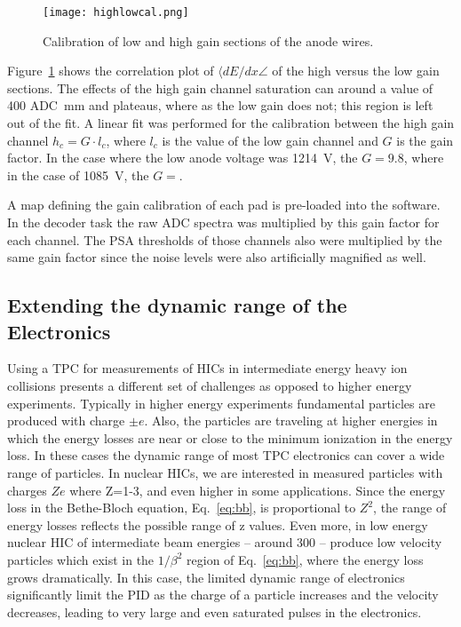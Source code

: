 \begin{figure}[!htb]
\texttt{[image: highlowcal.png]}
\caption{Calibration of low and high gain sections of the anode wires.}
\label{fig:highlowcal}
\end{figure}

Figure~\ref{fig:highlowcal} shows the correlation plot of $\langle dE/dx\angle$ of the high versus the low gain sections. The effects of the high gain channel saturation can around a value of 400 ADC\si{\per\milli\metre} and plateaus, where as the low gain does not; this region is left out of the fit. A linear fit was performed for the calibration between the high gain channel $h_c = G\cdot l_c$, where $l_c$ is the value of the low gain channel and $G$ is the gain factor. In the case where the low anode voltage was \SI{1214}{\volt}, the $G=9.8$, where in the case of \SI{1085}{\volt}, the $G = $.  

 A map defining the gain calibration of each pad is pre-loaded into the software. In the decoder task the raw ADC spectra was multiplied by this gain factor for each channel. The PSA thresholds of those channels also were multiplied by the same gain factor since the noise levels were also artificially magnified as well. 

\subsection{Extending the dynamic range of the Electronics}
\label{sec:extendDynamicRange}

Using a TPC for measurements of HICs in intermediate energy heavy ion collisions presents a different set of challenges as opposed to higher energy experiments. Typically in higher energy experiments fundamental particles are produced with charge $\pm e$. Also, the particles are traveling at higher energies in which the energy losses are near or close to the minimum ionization in the energy loss. In these cases the dynamic range of most TPC electronics can cover a wide range of particles. In nuclear HICs, we are interested in measured particles with charges $Ze$ where Z=1-3, and even higher in some applications. Since the energy loss in the Bethe-Bloch equation, Eq.~\ref{eq:bb}, is proportional to $Z^2$, the range of energy losses reflects the possible range of z values. Even more, in low energy nuclear HIC of intermediate beam energies -- around \SI{300}{\MeVA} -- produce low velocity particles which exist in the $1/\beta^2$ region of Eq.~\ref{eq:bb}, where the energy loss grows dramatically. In this case, the limited dynamic range of electronics significantly limit the PID as the charge of a particle increases and the velocity decreases, leading to very large and even saturated pulses in the electronics. 

